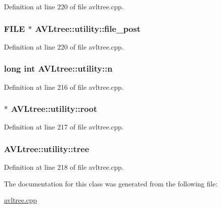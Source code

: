 Definition at line 220 of file avltree.\-cpp.

\hypertarget{class_a_v_ltree_1_1utility_a1e622d73b2fb80fa422f6f102519cef8}{
\subsubsection[{file\-\_\-post}]{\setlength{\rightskip}{0pt plus 5cm}F\-I\-L\-E $\ast$ A\-V\-Ltree\-::utility\-::file\-\_\-post}}\label{class_a_v_ltree_1_1utility_a1e622d73b2fb80fa422f6f102519cef8}


Definition at line 220 of file avltree.\-cpp.

\hypertarget{class_a_v_ltree_1_1utility_a670d69758bb1e9d12b4201b7ec9af69a}{
\subsubsection[{n}]{\setlength{\rightskip}{0pt plus 5cm}long int A\-V\-Ltree\-::utility\-::n}}\label{class_a_v_ltree_1_1utility_a670d69758bb1e9d12b4201b7ec9af69a}


Definition at line 216 of file avltree.\-cpp.

\hypertarget{class_a_v_ltree_1_1utility_ad280714781d2107450345a21a1363931}{
\subsubsection[{root}]{$\ast$ A\-V\-Ltree\-::utility\-::root}}\label{class_a_v_ltree_1_1utility_ad280714781d2107450345a21a1363931}


Definition at line 217 of file avltree.\-cpp.

\hypertarget{class_a_v_ltree_1_1utility_a7229b90aa265e8b738654dd3c603c97d}{
\subsubsection[{tree}]{ A\-V\-Ltree\-::utility\-::tree}}\label{class_a_v_ltree_1_1utility_a7229b90aa265e8b738654dd3c603c97d}


Definition at line 218 of file avltree.\-cpp.



The documentation for this class was generated from the following file\-:\begin{DoxyCompactItemize}
\item 
\hyperlink{avltree_8cpp}{avltree.\-cpp}\end{DoxyCompactItemize}
